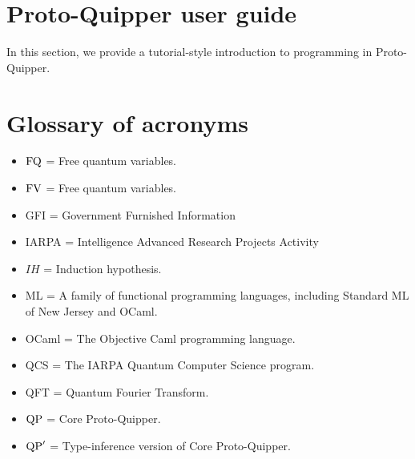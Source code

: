 \documentclass[twoside]{article}
\begin{document}
\clearpage
\section{Proto-Quipper user guide}
\label{sec-user-guide}

In this section, we provide a tutorial-style introduction to 
programming in Proto-Quipper. 



\clearpage
\section*{Glossary of acronyms}

\begin{itemize}
  \item $\mathop{\textrm{FQ}}\nolimits$ = Free quantum variables.
  \item $\mathop{\textrm{FV}}\nolimits$ = Free quantum variables.
  \item GFI = Government Furnished Information
  \item IARPA = Intelligence Advanced Research Projects Activity
  \item $IH$ = Induction hypothesis.
  \item ML = A family of functional programming languages, including
    Standard ML of New Jersey and OCaml.
  \item OCaml = The Objective Caml programming language.
  \item QCS = The IARPA Quantum Computer Science program.
  \item QFT = Quantum Fourier Transform.
  \item ${\rm QP}$ = Core Proto-Quipper.
  \item ${\rm QP}'$ = Type-inference version of Core Proto-Quipper.
\end{itemize}

\clearpage

{}

\end{document}
